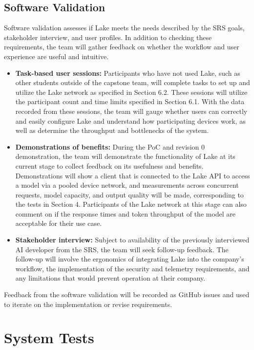 \documentclass[12pt, titlepage]{article}
\begin{document}
\subsection{Software Validation}
\label{sec:SoftVal}
Software validation assesses if Lake meets the needs described by the SRS goals, stakeholder interview, and user profiles. In addition to checking these requirements, the team will gather feedback on whether the workflow and user experience are useful and intuitive.
\begin{itemize}
  \item \textbf{Task-based user sessions:}
  Participants who have not used Lake, such as other students outside of the capstone team, will complete tasks to set up and utilize the Lake network as specified in Section 6.2. These sessions will utilize the participant count and time limits specified in Section 6.1. With the data recorded from these sessions, the team will gauge whether users can correctly and easily configure Lake and understand how participating devices work, as well as determine the throughput and bottlenecks of the system.

  \item \textbf{Demonstrations of benefits:}
  During the PoC and revision 0 demonstration, the team will demonstrate the functionality of Lake at its current stage to collect feedback on its usefulness and benefits. Demonstrations will show a client that is connected to the Lake API to access a model via a pooled device network, and measurements across concurrent requests, model capacity, and output quality will be made, corresponding to the tests in Section 4. Participants of the Lake network at this stage can also comment on if the response times and token throughput of the model are acceptable for their use case.

  \item \textbf{Stakeholder interview:}
  Subject to availability of the previously interviewed AI developer from the SRS, the team will seek follow-up feedback. The follow-up will involve the ergonomics of integrating Lake into the company's workflow, the implementation of the security and telemetry requirements, and any limitations that would prevent operation at their company.

\end{itemize}
Feedback from the software validation will be recorded as GitHub issues and used to iterate on the implementation or revise requirements.

\section{System Tests}
\end{document}
